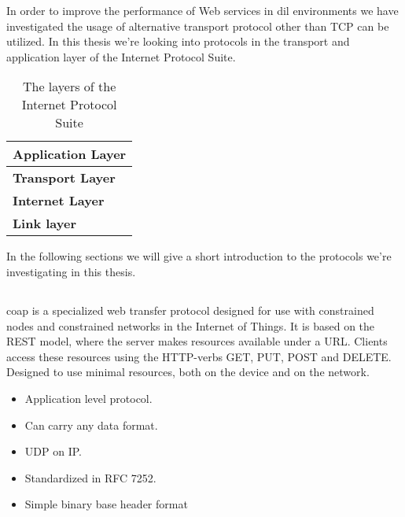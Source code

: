 In order to improve the performance of Web services in \gls{dil} environments we
have investigated the usage of alternative transport protocol other than TCP can
be utilized. In this thesis we're looking into protocols in the transport and
application layer of the Internet Protocol Suite\cite{rfc-1122}.

\begin{table}[h]
\begin{tabularx}{\textwidth}{| X |}
\hline
  \textbf{Application Layer} \\ \hline
  \textbf{Transport Layer} \\ \hline
  \textbf{Internet Layer} \\ \hline
  \textbf{Link layer} \\ \hline
\end{tabularx}
\caption{The layers of the Internet Protocol Suite}
\end{table}


In the following sections we will give a short introduction to the protocols we're
investigating in this thesis.



\subsection{}

\gls{coap} is a specialized web transfer protocol designed for use with
constrained nodes and constrained networks in the Internet of Things. It is
based on the REST model, where the server makes resources available  under a
URL. Clients access these resources using the HTTP-verbs GET, PUT, POST and
DELETE. Designed to use minimal resources, both on the device and on the
network.

\begin{itemize}
    \item Application level protocol.
    \item Can carry any data format.
    \item UDP on IP.
    \item Standardized in RFC 7252.
    \item Simple binary base header format
\end{itemize}


\subsection{}


